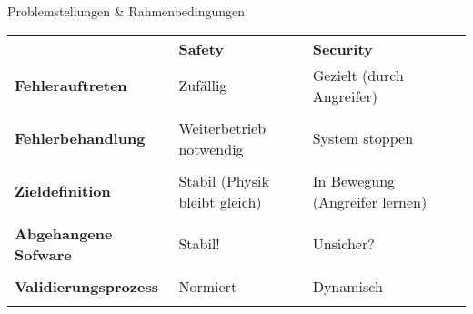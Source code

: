 \begin{frame}[T]{Problemstellungen \& Rahmenbedingungen}
\small

	\begin{tabular}{lllll}
                               & \textbf{Safety}              & \textbf{Security}              \\[1.4em]

  \arrayrulecolor{lightgray}
  \textbf{Fehlerauftreten}     & Zufällig                     & Gezielt (durch Angreifer)      \\[0.35em]
  \midrule                                                                                     \\[-0.75em]
	\textbf{Fehlerbehandlung}    & Weiterbetrieb notwendig      & System stoppen                 \\[0.35em]
  \midrule                                                                                     \\[-0.75em]
  \textbf{Zieldefinition}      & Stabil (Physik bleibt gleich) & In Bewegung (Angreifer lernen)  \\[0.35em]
  \midrule                                                                                     \\[-0.75em]
	\textbf{Abgehangene Sofware} & Stabil!                      & Unsicher?                      \\[0.35em]
  \midrule                                                                                     \\[-0.75em]
	\textbf{Validierungsprozess} & Normiert                     & Dynamisch                      \\
	                             &                              &
	\end{tabular}


\end{frame}
